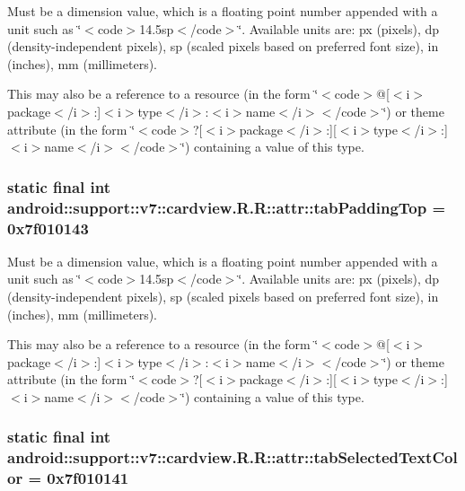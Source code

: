 Must be a dimension value, which is a floating point number appended with a unit such as \char`\"{}$<$code$>$14.5sp$<$/code$>$\char`\"{}. Available units are: px (pixels), dp (density-independent pixels), sp (scaled pixels based on preferred font size), in (inches), mm (millimeters). 

This may also be a reference to a resource (in the form \char`\"{}$<$code$>$@\mbox{[}$<$i$>$package$<$/i$>$:\mbox{]}$<$i$>$type$<$/i$>$:$<$i$>$name$<$/i$>$$<$/code$>$\char`\"{}) or theme attribute (in the form \char`\"{}$<$code$>$?\mbox{[}$<$i$>$package$<$/i$>$:\mbox{]}\mbox{[}$<$i$>$type$<$/i$>$:\mbox{]}$<$i$>$name$<$/i$>$$<$/code$>$\char`\"{}) containing a value of this type. \hypertarget{classandroid_1_1support_1_1v7_1_1cardview_1_1_r_1_1attr_21c09bebdf82d16eb1150dfcabd47895}{
\subsubsection[{tabPaddingTop}]{\setlength{\rightskip}{0pt plus 5cm}static final int android::support::v7::cardview.R.R::attr::tabPaddingTop = 0x7f010143}}
\label{classandroid_1_1support_1_1v7_1_1cardview_1_1_r_1_1attr_21c09bebdf82d16eb1150dfcabd47895}


Must be a dimension value, which is a floating point number appended with a unit such as \char`\"{}$<$code$>$14.5sp$<$/code$>$\char`\"{}. Available units are: px (pixels), dp (density-independent pixels), sp (scaled pixels based on preferred font size), in (inches), mm (millimeters). 

This may also be a reference to a resource (in the form \char`\"{}$<$code$>$@\mbox{[}$<$i$>$package$<$/i$>$:\mbox{]}$<$i$>$type$<$/i$>$:$<$i$>$name$<$/i$>$$<$/code$>$\char`\"{}) or theme attribute (in the form \char`\"{}$<$code$>$?\mbox{[}$<$i$>$package$<$/i$>$:\mbox{]}\mbox{[}$<$i$>$type$<$/i$>$:\mbox{]}$<$i$>$name$<$/i$>$$<$/code$>$\char`\"{}) containing a value of this type. \hypertarget{classandroid_1_1support_1_1v7_1_1cardview_1_1_r_1_1attr_a4e8f44a303a59a320f8e72355c7704d}{
\subsubsection[{tabSelectedTextColor}]{\setlength{\rightskip}{0pt plus 5cm}static final int android::support::v7::cardview.R.R::attr::tabSelectedTextColor = 0x7f010141}}
\label{classandroid_1_1support_1_1v7_1_1cardview_1_1_r_1_1attr_a4e8f44a303a59a320f8e72355c7704d}


